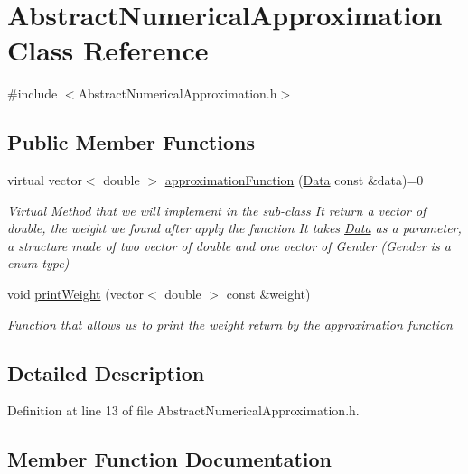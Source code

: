 \hypertarget{class_abstract_numerical_approximation}{}\section{Abstract\+Numerical\+Approximation Class Reference}
\label{class_abstract_numerical_approximation}


{\ttfamily \#include $<$Abstract\+Numerical\+Approximation.\+h$>$}

\subsection*{Public Member Functions}
\begin{DoxyCompactItemize}
\item 
virtual vector$<$ double $>$ \mbox{\hyperlink{class_abstract_numerical_approximation_aaf647fb522cf0d424d31a67230e19a62}{approximation\+Function}} (\mbox{\hyperlink{struct_data}{Data}} const \&data)=0
\begin{DoxyCompactList}\small\item\em Virtual Method that we will implement in the sub-\/class It return a vector of double, the weight we found after apply the function It takes \mbox{\hyperlink{struct_data}{Data}} as a parameter, a structure made of two vector of double and one vector of Gender (Gender is a enum type) \end{DoxyCompactList}\item 
void \mbox{\hyperlink{class_abstract_numerical_approximation_a841c83a7ae9f2146001581f3a7f8444a}{print\+Weight}} (vector$<$ double $>$ const \&weight)
\begin{DoxyCompactList}\small\item\em Function that allows us to print the weight return by the approximation function \end{DoxyCompactList}\end{DoxyCompactItemize}


\subsection{Detailed Description}


Definition at line 13 of file Abstract\+Numerical\+Approximation.\+h.



\subsection{Member Function Documentation}
\mbox{\label{class_abstract_numerical_approximation_aaf647fb522cf0d424d31a67230e19a62}} 
